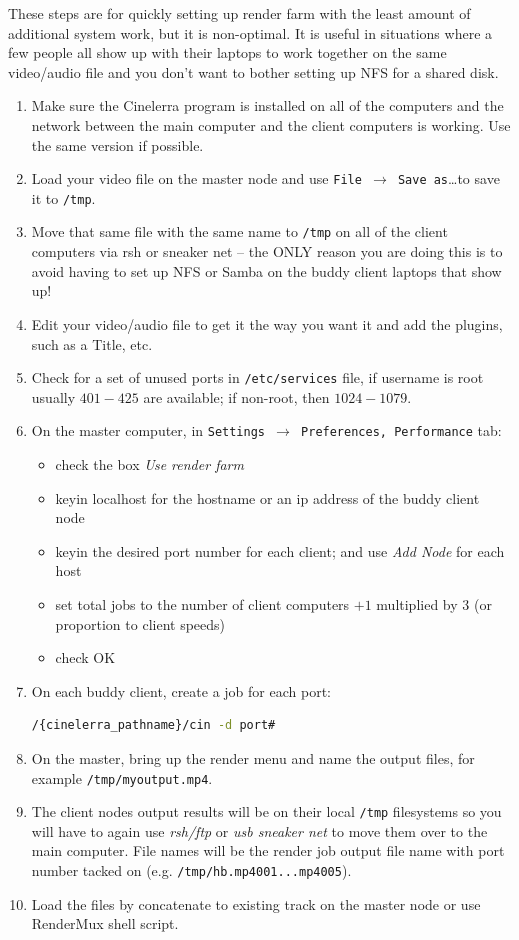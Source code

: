 These steps are for quickly setting up render farm with the least amount of additional system work, but it is non-optimal.  It is useful in situations where a few people all show up with their laptops to work together on the same video/audio file and you don’t want to bother setting up NFS for a shared disk.

\begin{enumerate}
    \item Make sure the Cinelerra program is installed on all of the computers and the network between the
    main computer and the client computers is working.  Use the same version if possible.
    \item Load your video file on the master node and use \texttt{File $\rightarrow$ Save as}\dots  to save it to \texttt{/tmp}.
    \item Move that same file with the same name to \texttt{/tmp} on all of the client computers via rsh or sneaker net -- the ONLY reason you are doing this is to avoid having to set up NFS or Samba on the buddy client
    laptops that show up!
    \item Edit your video/audio file to get it the way you want it and add the plugins, such as a Title, etc.
    \item Check for a set of unused ports in \texttt{/etc/services} file, if username is root usually $401-425$ are
    available; if non-root, then $1024-1079$.
    \item On the master computer, in \texttt{Settings $\rightarrow$ Preferences, Performance} tab:
    \begin{itemize}
        \item check the box \textit{Use render farm}
        \item keyin localhost for the hostname or an ip address of the buddy client node
        \item keyin the desired port number for each client; and use \textit{Add Node} for each host
        \item set total jobs to the number of client computers $+1$ multiplied by $3$ (or proportion to client speeds)
        \item check OK
    \end{itemize}
    \item On each buddy client, create a job for each port:    
    \begin{lstlisting}[language=bash,numbers=none]
/{cinelerra_pathname}/cin -d port#
    \end{lstlisting}
    \item On the master, bring up the render menu and name the output files, for example \texttt{/tmp/myoutput.mp4}.
    \item The client nodes output results will be on their local \texttt{/tmp} filesystems so you will have to again use
    \textit{rsh/ftp} or \textit{usb sneaker net} to move them over to the main computer.  File names will be the render
    job output file name with port number tacked on (e.g. \texttt{/tmp/hb.mp4001...mp4005}).
    \item Load the files by concatenate to existing track on the master node or use RenderMux shell script.
\end{enumerate}

